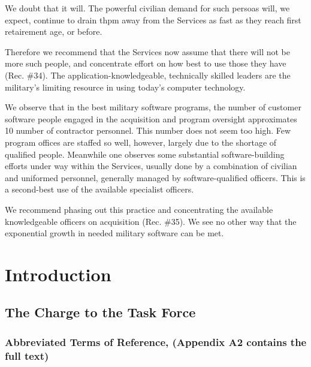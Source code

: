 \documentclass[12pt]{article}
\begin{document}
We doubt that it will. The powerful civilian demand for such persoas will, we expect,
continue to drain thpm away from the Services as fast as they reach first retairement age,
or before. %

Therefore we recommend that the Services now assume that there will not be more
such people, and concentrate effort on how best to use those they have (Rec. \#34). The
application-knowledgeable, technically skilled leaders are the military's limiting resource
in using today's computer technology.

We observe that in the best military software programs, the number of customer
software people engaged in the acquisition and program oversight approximates 10%
number of contractor personnel. This number does not seem too high. Few program offices
are staffed so well, however, largely due to the shortage of qualified people. Meanwhile
one observes some substantial software-building efforts under way within the Services,
usually done by a combination of civilian and uniformed personnel, generally managed by
software-qualified officers. This is a second-best use of the available specialist officers.

We recommend phasing out this practice and concentrating the available knowledgeable
officers on acquisition (Rec. \#35). We see no other way that the exponential growth in
needed military software can be met.

\section{Introduction}

\subsection{The Charge to the Task Force}

\subsubsection*{Abbreviated Terms of Reference, (Appendix A2 contains the full text)}
\end{document}
